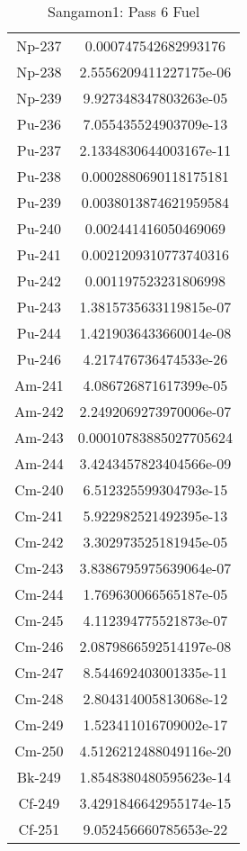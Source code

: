 \begin{table}[h!]
\begin{tabular}{|| c || c |}
Np-237 & 0.000747542682993176 \\
Np-238 & 2.5556209411227175e-06 \\
Np-239 & 9.927348347803263e-05 \\
Pu-236 & 7.055435524903709e-13 \\
Pu-237 & 2.1334830644003167e-11 \\
Pu-238 & 0.0002880690118175181 \\
Pu-239 & 0.0038013874621959584 \\
Pu-240 & 0.002441416050469069 \\
Pu-241 & 0.0021209310773740316 \\
Pu-242 & 0.001197523231806998 \\
Pu-243 & 1.3815735633119815e-07 \\
Pu-244 & 1.4219036433660014e-08 \\
Pu-246 & 4.217476736474533e-26 \\
Am-241 & 4.086726871617399e-05 \\
Am-242 & 2.2492069273970006e-07 \\
Am-243 & 0.00010783885027705624 \\
Am-244 & 3.4243457823404566e-09 \\
Cm-240 & 6.512325599304793e-15 \\
Cm-241 & 5.922982521492395e-13 \\
Cm-242 & 3.302973525181945e-05 \\
Cm-243 & 3.8386795975639064e-07 \\
Cm-244 & 1.769630066565187e-05 \\
Cm-245 & 4.112394775521873e-07 \\
Cm-246 & 2.0879866592514197e-08 \\
Cm-247 & 8.544692403001335e-11 \\
Cm-248 & 2.804314005813068e-12 \\
Cm-249 & 1.523411016709002e-17 \\
Cm-250 & 4.5126212488049116e-20 \\
Bk-249 & 1.8548380480595623e-14 \\
Cf-249 & 3.4291846642955174e-15 \\
Cf-251 & 9.052456660785653e-22 \\

\hline
\end{tabular}
\caption{Sangamon1: Pass 6 Fuel}
\label{table:sang1p6fuel}
\end{table}